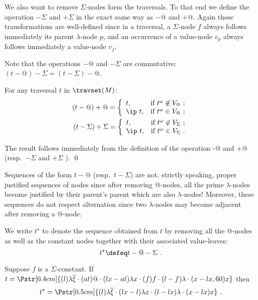 We also want to remove $\Sigma$-nodes form the traversals. To that end we define the operation $-\Sigma$ and $+\Sigma$ in the exact same way as $-@$ and $+@$. Again these transformations are well-defined since in a traversal, a $\Sigma$-node $f$ always follows immediately its parent $\lambda$-node $p$, and an occurrence of a value-node $v_p$ always follows immediately a value-node $v_f$.

Note that the operations $-@$ and $-\Sigma$ are commutative:
$(t-@)-\Sigma = (t-\Sigma)-@$.

\begin{lemma} \label{lem:minus_at_plus_at}
For any traversal $t$ in $\travset(M)$:
\begin{align*}
(t-@)+@ = \left\{
            \begin{array}{ll}
              t, & \hbox{if $t^\omega \not\in V_@$\ ;} \\
              \ip\ t, & \hbox{if $t^\omega \in V_@$\ ;}
            \end{array}
          \right.
\\
(t-\Sigma)+\Sigma = \left\{
            \begin{array}{ll}
              t, & \hbox{if $t^\omega \not\in V_\Sigma$\ ;} \\
              \ip\ t, & \hbox{if $t^\omega \in V_\Sigma$\ .}
            \end{array}
          \right.
\end{align*}
\end{lemma}
\proof The result follows immediately from the definition of the
operation -@ and +@ (resp.\ $-\Sigma$ and $+\Sigma$ ). \qed

\begin{remark}
Sequences of the form $t-@$ (resp.\ $t-\Sigma$) are not, strictly
speaking, proper justified sequences of nodes since after removing
@-nodes, all the prime $\lambda$-nodes become justified by their
parent's parent which are also $\lambda$-nodes!  Moreover, these
sequences do not respect alternation since two $\lambda$-nodes may
become adjacent after removing a @-node.
\end{remark}
\bigskip

We write $t^\star$ to denote the sequence obtained from $t$ by
removing all the @-nodes as well as the constant nodes together with
their associated value-leaves:
$$ t^\star \defeq t -@ - \Sigma \ .$$
\begin{example} Suppose $f$ is a $\Sigma$-constant.
If $t = \Pstr[0.4cm]{ (l){\lambda \overline{\xi}} \cdot (at)@ \cdot
(lx-at){\lambda x}\cdot (f)f \cdot (l-f){\lambda} \cdot (x-lx,60)x}$
then
$$t^\star = \Pstr[0.5cm]{ (l){\lambda \overline{\xi}}
 \cdot (lx-l){\lambda x}\cdot (l-lx){\lambda} \cdot (x-lx)x} \ .$$
\end{example}

